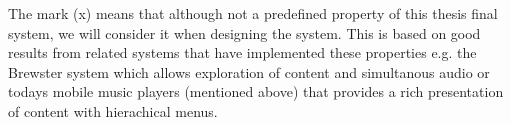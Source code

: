The mark (x) means that although not a predefined property of this thesis final system, we will consider it when designing the system. This is based on good results from related systems that have implemented these properties e.g. the Brewster \cite{brewster_multimodal_2003} system which allows exploration of content and simultanous audio or todays mobile music players (mentioned above) that provides a rich presentation of content with hierachical menus.












